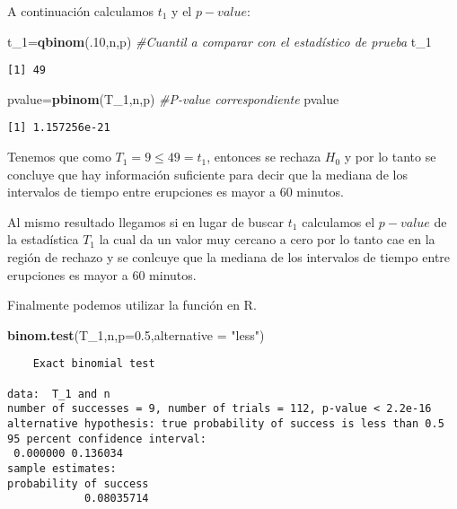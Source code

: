 \documentclass[
  a4paper,
  oneside,
  openany]{book}
\newenvironment{Shaded}{\begin{snugshade}}{\end{snugshade}}
\newcommand{\CommentTok}[1]{\textcolor[rgb]{0.56,0.35,0.01}{\textit{#1}}}
\newcommand{\DataTypeTok}[1]{\textcolor[rgb]{0.13,0.29,0.53}{#1}}
\newcommand{\DecValTok}[1]{\textcolor[rgb]{0.00,0.00,0.81}{#1}}
\newcommand{\FloatTok}[1]{\textcolor[rgb]{0.00,0.00,0.81}{#1}}
\newcommand{\KeywordTok}[1]{\textcolor[rgb]{0.13,0.29,0.53}{\textbf{#1}}}
\newcommand{\NormalTok}[1]{#1}
\newcommand{\StringTok}[1]{\textcolor[rgb]{0.31,0.60,0.02}{#1}}
\begin{document}
A continuación calculamos \(t_1\) y el \(p-value\):

\begin{Shaded}
\begin{Highlighting}[]
\NormalTok{t\_}\DecValTok{1}\NormalTok{=}\KeywordTok{qbinom}\NormalTok{(.}\DecValTok{10}\NormalTok{,n,p)        }\CommentTok{\#Cuantil a comparar con el estadístico de prueba}
\NormalTok{t\_}\DecValTok{1}
\end{Highlighting}
\end{Shaded}

\begin{verbatim}
[1] 49
\end{verbatim}

\begin{Shaded}
\begin{Highlighting}[]
\NormalTok{pvalue=}\KeywordTok{pbinom}\NormalTok{(T\_}\DecValTok{1}\NormalTok{,n,p)     }\CommentTok{\#P{-}value correspondiente}
\NormalTok{pvalue}
\end{Highlighting}
\end{Shaded}

\begin{verbatim}
[1] 1.157256e-21
\end{verbatim}

Tenemos que como \(T_1=9\leq 49 =t_1\), entonces se rechaza \(H_0\) y por lo tanto se concluye que hay información suficiente para decir que la mediana de los intervalos de tiempo entre erupciones es mayor a 60 minutos.

Al mismo resultado llegamos si en lugar de buscar \(t_1\) calculamos el \(p-value\) de la estadística \(T_1\) la cual da un valor muy cercano a cero por lo tanto cae en la región de rechazo y se conlcuye que la mediana de los intervalos de tiempo entre erupciones es mayor a 60 minutos.

Finalmente podemos utilizar la función en R.

\begin{Shaded}
\begin{Highlighting}[]
\KeywordTok{binom.test}\NormalTok{(T\_}\DecValTok{1}\NormalTok{,n,}\DataTypeTok{p=}\FloatTok{0.5}\NormalTok{,}\DataTypeTok{alternative =} \StringTok{"less"}\NormalTok{)}
\end{Highlighting}
\end{Shaded}

\begin{verbatim}
    Exact binomial test

data:  T_1 and n
number of successes = 9, number of trials = 112, p-value < 2.2e-16
alternative hypothesis: true probability of success is less than 0.5
95 percent confidence interval:
 0.000000 0.136034
sample estimates:
probability of success 
            0.08035714 
\end{verbatim}
\end{document}
